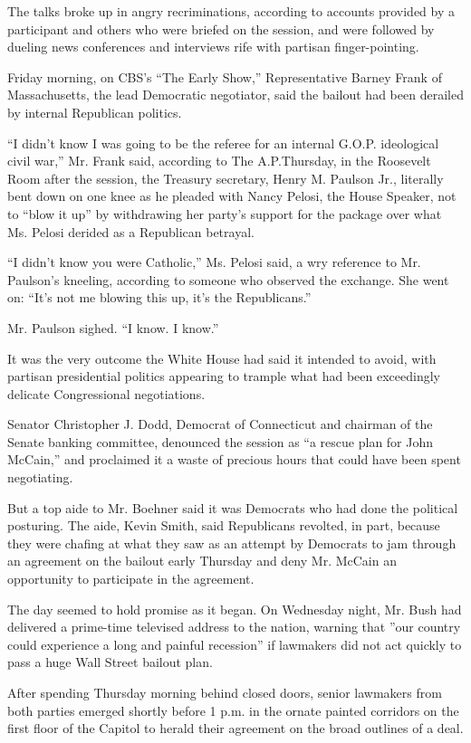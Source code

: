 The talks broke up in angry recriminations, according to accounts
provided by a participant and others who were briefed on the session,
and were followed by dueling news conferences and interviews rife with
partisan finger-pointing.

Friday morning, on CBS's ``The Early Show,'' Representative Barney Frank
of Massachusetts, the lead Democratic negotiator, said the bailout had
been derailed by internal Republican politics.

``I didn't know I was going to be the referee for an internal G.O.P.
ideological civil war,'' Mr. Frank said, according to The A.P.Thursday,
in the Roosevelt Room after the session, the Treasury secretary, Henry
M. Paulson Jr., literally bent down on one knee as he pleaded with Nancy
Pelosi, the House Speaker, not to ``blow it up'' by withdrawing her
party's support for the package over what Ms. Pelosi derided as a
Republican betrayal.

``I didn't know you were Catholic,'' Ms. Pelosi said, a wry reference to
Mr. Paulson's kneeling, according to someone who observed the exchange.
She went on: ``It's not me blowing this up, it's the Republicans.''

Mr. Paulson sighed. ``I know. I know.''

It was the very outcome the White House had said it intended to avoid,
with partisan presidential politics appearing to trample what had been
exceedingly delicate Congressional negotiations.

Senator Christopher J. Dodd, Democrat of Connecticut and chairman of the
Senate banking committee, denounced the session as ``a rescue plan for
John McCain,'' and proclaimed it a waste of precious hours that could
have been spent negotiating.

But a top aide to Mr. Boehner said it was Democrats who had done the
political posturing. The aide, Kevin Smith, said Republicans revolted,
in part, because they were chafing at what they saw as an attempt by
Democrats to jam through an agreement on the bailout early Thursday and
deny Mr. McCain an opportunity to participate in the agreement.

The day seemed to hold promise as it began. On Wednesday night, Mr. Bush
had delivered a prime-time televised address to the nation, warning that
''our country could experience a long and painful recession'' if
lawmakers did not act quickly to pass a huge Wall Street bailout plan.

After spending Thursday morning behind closed doors, senior lawmakers
from both parties emerged shortly before 1 p.m. in the ornate painted
corridors on the first floor of the Capitol to herald their agreement on
the broad outlines of a deal.

